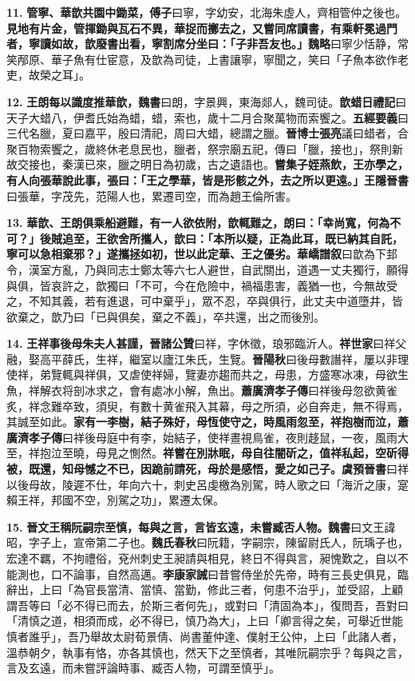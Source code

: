 \textbf{11.} \textbf{管寧、華歆共園中鋤菜，}{\footnotesize \textbf{傅子}曰寧，字幼安，北海朱虛人，齊相管仲之後也。}\textbf{見地有片金，管揮鋤與瓦石不異，華捉而擲去之，又嘗同席讀書，有乘軒冕過門者，寧讀如故，歆廢書出看，寧割席分坐曰：「子非吾友也。」}{\footnotesize \textbf{魏略}曰寧少恬静，常笑邴原、華子魚有仕宦意，及歆為司徒，上書讓寧，寧聞之，笑曰「子魚本欲作老吏，故榮之耳」。}

\textbf{12.} \textbf{王朗每以識度推華歆，}{\footnotesize \textbf{魏書}曰朗，字景興，東海郯人，魏司徒。}\textbf{歆蜡日}{\footnotesize \textbf{禮記}曰天子大蜡八，伊耆氏始為蜡，蜡，索也，歲十二月合聚萬物而索饗之。\textbf{五經要義}曰三代名臘，夏曰嘉平，殷曰清祀，周曰大蜡，總謂之臘。\textbf{晉博士張亮}議曰蜡者，合聚百物索饗之，歲終休老息民也，臘者，祭宗廟五祀，傳曰「臘，接也」，祭則新故交接也，秦漢已來，臘之明日為初歲，古之遺語也。}\textbf{嘗集子姪燕飲，王亦學之，有人向張華說此事，張曰：「王之學華，皆是形骸之外，去之所以更遠。」}{\footnotesize \textbf{王隱晉書}曰張華，字茂先，范陽人也，累遷司空，而為趙王倫所害。}

\textbf{13.} \textbf{華歆、王朗俱乘船避難，有一人欲依附，歆輒難之，朗曰：「幸尚寬，何為不可？」後賊追至，王欲舍所攜人，歆曰：「本所以疑，正為此耳，既已納其自託，寧可以急相棄邪？」遂攜拯如初，世以此定華、王之優劣。}{\footnotesize \textbf{華嶠譜叙}曰歆為下邽令，漢室方亂，乃與同志士鄭太等六七人避世，自武關出，道遇一丈夫獨行，願得與俱，皆哀許之，歆獨曰「不可，今在危險中，禍福患害，義猶一也，今無故受之，不知其義，若有進退，可中棄乎」，眾不忍，卒與俱行，此丈夫中道墮井，皆欲棄之，歆乃曰「已與俱矣，棄之不義」，卒共還，出之而後別。}

\textbf{14.} \textbf{王祥事後母朱夫人甚謹，}{\footnotesize \textbf{晉諸公贊}曰祥，字休徵，琅邪臨沂人。\textbf{祥世家}曰祥父融，娶高平薛氏，生祥，繼室以廬江朱氏，生覽。\textbf{晉陽秋}曰後母數譖祥，屢以非理使祥，弟覽輒與祥俱，又虐使祥婦，覽妻亦趨而共之，母患，方盛寒冰凍，母欲生魚，祥解衣将剖冰求之，會有處冰小解，魚出。\textbf{蕭廣濟孝子傳}曰祥後母忽欲黄雀炙，祥念難卒致，須臾，有數十黄雀飛入其幕，母之所須，必自奔走，無不得焉，其誠至如此。}\textbf{家有一李樹，結子殊好，母恆使守之，時風雨忽至，祥抱樹而泣，}{\footnotesize \textbf{蕭廣濟孝子傳}曰祥後母庭中有李，始結子，使祥晝視鳥雀，夜則趍鼠，一夜，風雨大至，祥抱泣至曉，母見之惻然。}\textbf{祥嘗在別牀眠，母自往闇斫之，值祥私起，空斫得被，既還，知母憾之不已，因跪前請死，母於是感悟，愛之如己子。}{\footnotesize \textbf{虞預晉書}曰祥以後母故，陵遲不仕，年向六十，刺史呂虔檄為別駕，時人歌之曰「海沂之康，寔賴王祥，邦國不空，別駕之功」，累遷太保。}

\textbf{15.} \textbf{晉文王稱阮嗣宗至慎，每與之言，言皆玄遠，未嘗臧否人物。}{\footnotesize \textbf{魏書}曰文王諱昭，字子上，宣帝第二子也。\textbf{魏氏春秋}曰阮籍，字嗣宗，陳留尉氏人，阮瑀子也，宏達不羈，不拘禮俗，兗州刺史王昶請與相見，終日不得與言，昶愧歎之，自以不能測也，口不論事，自然高邁。\textbf{李康家誡}曰昔嘗侍坐於先帝，時有三長史俱見，臨辭出，上曰「為官長當清、當慎、當勤，修此三者，何患不治乎」，並受詔，上顧謂吾等曰「必不得已而去，於斯三者何先」，或對曰「清固為本」，復問吾，吾對曰「清慎之道，相須而成，必不得已，慎乃為大」，上曰「卿言得之矣，可舉近世能慎者誰乎」，吾乃舉故太尉荀景倩、尚書董仲達、僕射王公仲，上曰「此諸人者，溫恭朝夕，執事有恪，亦各其慎也，然天下之至慎者，其唯阮嗣宗乎？每與之言，言及玄遠，而未嘗評論時事、臧否人物，可謂至慎乎」。}

